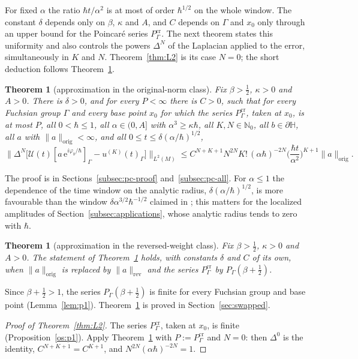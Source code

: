 \documentclass[twoside,10pt]{article}
\numberwithin{equation}{section}
\theoremstyle{slbody}
\newtheorem{theorem}[equation]{Theorem}
\theoremstyle{remark}
\newcommand{\Hb}{\mathbb{H}}
\newcommand{\norm}[1]{\lVert #1\rVert}
\newcommand{\ue}{\mathrm{e}}
\newcommand{\cU}{\mathcal{U}}
\newcommand{\pcNorm}[1]{\norm{#1}_{\mathrm{orig}}}
\newcommand{\swNorm}[1]{\norm{#1}_{\mathrm{rev}}}
\begin{document}
For fixed $\alpha$ the ratio $\hbar t/\alpha^2$ is at most of order $\hbar^{1/2}$ on the whole window. The constant $\delta$ depends only
on $\beta$, $\kappa$ and $A$, and $C$ depends on $\Gamma$ and $x_0$ only through an upper bound for the Poincar\'e series
$P^{\mathrm{cr}}_\Gamma$. The next theorem states this uniformity and also controls the powers $\Delta^N$ of the Laplacian applied to
the error, simultaneously in $K$ and $N$. Theorem~\ref{thm:L2} is its case $N=0$; the short deduction follows
Theorem~\ref{thm:dd14}.

\begin{theorem}[approximation in the original-norm class]\label{pc:main}\label{pc:allalpha}
Fix $\beta>\tfrac12$, $\kappa>0$ and $A>0$. There is $\delta>0$, and for every $P<\infty$ there is $C>0$, such that for every
Fuchsian group $\Gamma$ and every base point $x_0$ for which the series $P^{\mathrm{cr}}_\Gamma$, taken at $x_0$, is at most
$P$, all $0<\hbar\le1$, all $\alpha\in(0,A]$ with
$\alpha^3\ge\kappa\hbar$, all $K,N\in\mathbb N_0$, all $b\in\partial\Hb$, all $a$ with $\pcNorm{a}<\infty$, and all
$0\le t\le\delta(\alpha/\hbar)^{1/2}$,
\[
  \norm{\Delta^N\big[\cU(t)[a\,\ue^{i\varphi_b/\hbar}]_\Gamma-u^{(K)}(t)_\Gamma\big]}_{L^2(M)}
  \le C^{N+K+1}N^{2N}K!\,(\alpha\hbar)^{-2N}\Big(\frac{\hbar t}{\alpha^2}\Big)^{K+1}\pcNorm{a}.
\]
\end{theorem}

The proof is in Sections~\ref{subsec:pc-proof} and~\ref{subsec:pc-all}. For $\alpha\le1$ the dependence of the time window on the
analytic radius, $\delta(\alpha/\hbar)^{1/2}$, is more favourable than the window $\delta\alpha^{3/2}\hbar^{-1/2}$ claimed in
\cite[Theorem~1.4]{S}; this matters for the localized amplitudes of Section~\ref{subsec:applications}, whose analytic radius
tends to zero with $\hbar$.

\begin{theorem}[approximation in the reversed-weight class]\label{thm:dd14}
Fix $\beta>\tfrac12$, $\kappa>0$ and $A>0$. The statement of Theorem~\ref{pc:main} holds, with constants $\delta$ and $C$ of its
own, when $\pcNorm a$ is replaced by $\swNorm a$ and the series $P^{\mathrm{cr}}_\Gamma$ by $P_\Gamma(\beta+\tfrac12)$.
\end{theorem}

Since $\beta+\tfrac12>1$, the series $P_\Gamma(\beta+\tfrac12)$ is finite for every Fuchsian group and base point (Lemma~\ref{lem:p1}).
Theorem~\ref{thm:dd14} is proved in Section~\ref{sec:swapped}.

\begin{proof}[Proof of Theorem~\ref{thm:L2}]
The series $P^{\mathrm{cr}}_\Gamma$, taken at $x_0$, is finite (Proposition~\ref{os:p1}). Apply Theorem~\ref{pc:main} with
$P:=P^{\mathrm{cr}}_\Gamma$ and $N=0$: then $\Delta^0$ is the identity, $C^{N+K+1}=C^{K+1}$, and $N^{2N}(\alpha\hbar)^{-2N}=1$.
\end{proof}
\end{document}

